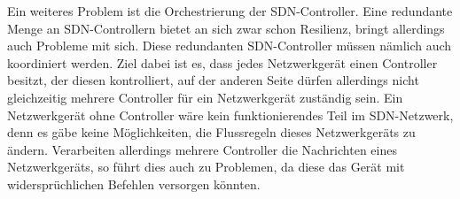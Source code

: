 Ein weiteres Problem ist die Orchestrierung der SDN-Controller. Eine redundante Menge an SDN-Controllern bietet an sich zwar schon Resilienz, bringt allerdings auch Probleme mit sich. 
Diese redundanten SDN-Controller müssen nämlich auch koordiniert werden. Ziel dabei ist es, dass jedes Netzwerkgerät einen Controller besitzt, der diesen kontrolliert, 
auf der anderen Seite dürfen allerdings nicht gleichzeitig mehrere Controller für ein Netzwerkgerät zuständig sein. Ein Netzwerkgerät ohne Controller wäre kein funktionierendes Teil im SDN-Netzwerk, 
denn es gäbe keine Möglichkeiten, die Flussregeln dieses Netzwerkgeräts zu ändern. Verarbeiten allerdings mehrere Controller die Nachrichten eines Netzwerkgeräts, so führt dies auch zu Problemen, 
da diese das Gerät mit widersprüchlichen Befehlen versorgen könnten.





